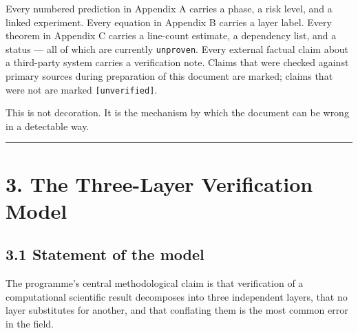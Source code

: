 \documentclass[
  11pt]{report}
\begin{document}
Every numbered prediction in Appendix A carries a phase, a risk level,
and a linked experiment. Every equation in Appendix B carries a layer
label. Every theorem in Appendix C carries a line-count estimate, a
dependency list, and a status --- all of which are currently
\texttt{unproven}. Every external factual claim about a third-party
system carries a verification note. Claims that were checked against
primary sources during preparation of this document are marked; claims
that were not are marked \texttt{{[}unverified{]}}.

This is not decoration. It is the mechanism by which the document can be
wrong in a detectable way.

\begin{center}\rule{0.5\linewidth}{0.5pt}\end{center}

\hypertarget{the-three-layer-verification-model}{%
\chapter{3. The Three-Layer Verification
Model}\label{the-three-layer-verification-model}}

\hypertarget{statement-of-the-model}{%
\section{3.1 Statement of the model}\label{statement-of-the-model}}

The programme's central methodological claim is that verification of a
computational scientific result decomposes into three independent
layers, that no layer substitutes for another, and that conflating them
is the most common error in the field.
\end{document}
